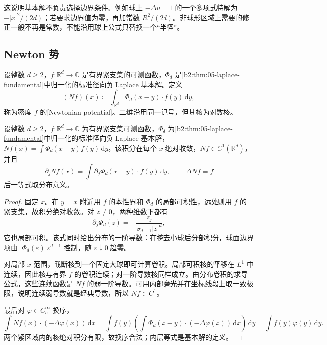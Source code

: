 这说明基本解不负责选择边界条件。例如球上 \(-\Delta u=1\) 的一个多项式特解为 \(-|x|^2/(2d)\)；若要求边界值为零，再加常数 \(R^2/(2d)\)。非球形区域上需要的修正一般不再是常数，不能沿用球上公式只替换一个“半径”。

\subsection{Newton 势}
\label{b2:subsec:130303}

\begin{definition}\label{b2:def:13-newton-potential}
设整数 \(d\geq2\)，\(f:\mathbb R^d\to\mathbb C\) 是有界紧支集的可测函数，\(\Phi_d\) 是\cref{b2:thm:05-laplace-fundamental}中归一化的标准径向负 Laplace 基本解。定义
\[
 (Nf)(x)\coloneqq\int_{\mathbb R^d}\Phi_d(x-y)\cdot f(y)\,\mathrm{d}y,
\]
称为密度 \(f\) 的[Newtonian potential]。二维沿用同一记号，但其核为对数核。
\end{definition}

\begin{proposition}\label{b2:prop:13-newton-c1}
设整数 \(d\geq2\)，\(f:\mathbb R^d\to\mathbb C\) 为有界紧支集可测函数，\(\Phi_d\) 为\cref{b2:thm:05-laplace-fundamental}中归一化的标准径向负 Laplace 基本解，\(Nf(x)=\int\Phi_d(x-y)f(y)\,\mathrm dy\)。该积分在每个 \(x\) 绝对收敛，\(Nf\in C^1(\mathbb R^d)\)，并且
\[
 \partial_jNf(x)=\int\partial_j\Phi_d(x-y)\cdot f(y)\,\mathrm{d}y,
 \quad-\Delta Nf=f
\]
后一等式取分布意义。
\end{proposition}
\begin{proof}
固定 \(x\)。在 \(y=x\) 附近用 \(f\) 的本性界和 \(\Phi_d\) 的局部可积性，远处则用 \(f\) 的紧支集，故积分绝对收敛。对 \(z\ne0\)，两种维数下都有
\[
 \partial_j\Phi_d(z)=-\dfrac{z_j}{\sigma_{d-1}|z|^d},
\]
它也局部可积。该式同时给出分布的一阶导数：在挖去小球后分部积分，球面边界项由 \(|\Phi_d(\varepsilon)|\varepsilon^{d-1}\) 控制，随 \(\varepsilon\downarrow0\) 趋零。

对局部 \(x\) 范围，截断核到一个固定大球即可计算卷积。局部可积核的平移在 \(L^1\) 中连续，因此核与有界 \(f\) 的卷积连续；对一阶导数核同样成立。由分布卷积的求导公式，这些连续函数是 \(Nf\) 的弱一阶导数。可用内部磨光并在坐标线段上取一致极限，说明连续弱导数就是经典导数，所以 \(Nf\in C^1\)。

最后对 \(\varphi\in C_c^\infty\) 换序，
\[
 \int Nf(x)\cdot(-\Delta\varphi(x))\,\mathrm{d}x
 =\int f(y)\left(\int\Phi_d(x-y)\cdot(-\Delta\varphi(x))\,\mathrm{d}x\right)\,\mathrm{d}y
 =\int f(y)\varphi(y)\,\mathrm{d}y.
\]
两个紧区域内的核绝对积分有限，故换序合法；内层等式是基本解的定义。
\end{proof}

